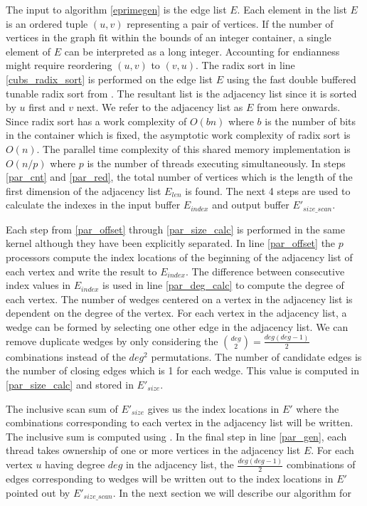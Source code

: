 \documentclass[conference]{IEEEtran}
\begin{document}
The input to algorithm \ref{eprimegen} is the edge list $E$. Each element in the list $E$ is an ordered tuple $(u,v)$ representing a pair of vertices. If the number of vertices in the graph fit within the bounds of an integer container, a single element of $E$ can be interpreted as a long integer. Accounting for endianness might require reordering $(u,v)$ to $(v,u)$. The radix sort in line \ref{cubs_radix_sort} is performed on the edge list $E$ using the fast double buffered tunable radix sort from \cite{b19}. The resultant list is the adjacency list since it is sorted by $u$ first and $v$ next. We refer to the adjacency list as $E$ from here onwards. Since radix sort has a work complexity of $O(bn)$ where $b$ is the number of bits in the container which is fixed, the asymptotic work complexity of radix sort is $O(n)$. The parallel time complexity of this shared memory implementation is $O(n/p)$ where $p$ is the number of threads executing simultaneously. In steps \ref{par_cnt} and \ref{par_red}, the total number of vertices which is the length of the first dimension of the adjacency list $E_{len}$ is found. The next 4 steps are used to calculate the indexes in the input buffer $E_{index}$ and output buffer $E'_{size\_scan}$. 

Each step from \ref{par_offset} through \ref{par_size_calc} is performed in the same kernel although they have been explicitly separated. In line \ref{par_offset} the $p$ processors compute the index locations of the beginning of the adjacency list of each vertex and write the result to $E_{index}$. The difference between consecutive index values in $E_{index}$ is used in line \ref{par_deg_calc} to compute the degree of each vertex. The number of wedges centered on a vertex in the adjacency list is dependent on the degree of the vertex. For each vertex in the adjacency list, a wedge can be formed by selecting one other edge in the adjacency list. We can remove duplicate wedges by only considering the ${deg \choose 2} = \frac{deg(deg-1)}{2}$ combinations instead of the $deg^2$ permutations. The number of candidate edges is the number of closing edges which is 1 for each wedge. This value is computed in \ref{par_size_calc} and stored in $E'_{size}$.

The inclusive scan sum of $E'_{size}$ gives us the index locations in $E'$ where the combinations corresponding to each vertex in the adjacency list will be written. The inclusive sum is computed using \cite{b19}. In the final step in line \ref{par_gen}, each thread takes ownership of one or more vertices in the adjacency list $E$. For each vertex $u$ having degree $deg$ in the adjacency list, the $\frac{deg(deg-1)}{2}$ combinations of edges corresponding to wedges will be written out to the index locations in $E'$ pointed out by $E'_{size\_scan}$. In the next section we will describe our algorithm for 
\end{document}
